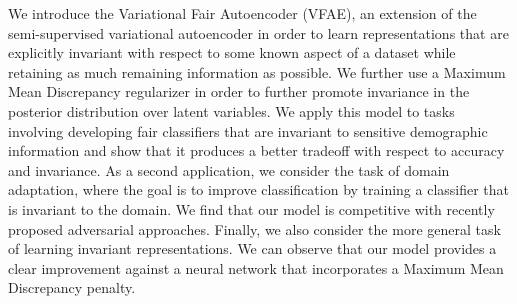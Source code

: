 We introduce the Variational Fair Autoencoder (VFAE), an extension of the semi-supervised variational autoencoder in order to learn representations that are explicitly invariant with respect to some known aspect of a dataset while retaining as much remaining information as possible. We further use a Maximum Mean Discrepancy regularizer in order to further promote invariance in the posterior distribution over latent variables. We apply this model to tasks involving developing fair classifiers that are invariant to sensitive demographic information and show that it produces a better tradeoff with respect to accuracy and invariance. As a second application, we consider the task of domain adaptation, where the goal is to improve classification by training a classifier that is invariant to the domain. We find that our model is competitive with recently proposed adversarial approaches. Finally, we also consider the more general task of learning invariant representations. We can observe that our model provides a clear improvement against a neural network that incorporates a Maximum Mean Discrepancy penalty.
